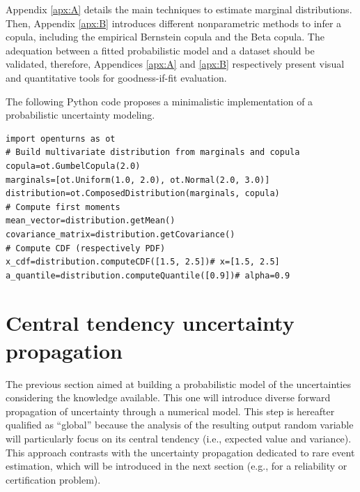 Appendix \ref{apx:A} details the main techniques to estimate marginal distributions. 
Then, Appendix \ref{apx:B} introduces different nonparametric methods to infer a copula, including the empirical Bernstein copula and the Beta copula. 
The adequation between a fitted probabilistic model and a dataset should be validated, therefore, Appendices \ref{apx:A} and \ref{apx:B} respectively present visual and quantitative tools for goodness-if-fit evaluation.


\begin{otexample}
    The following Python code proposes a minimalistic \ot implementation of a probabilistic uncertainty modeling. 
    \lstset{style=mystyle, language=python}
\begin{lstlisting}
import openturns as ot
# Build multivariate distribution from marginals and copula
copula=ot.GumbelCopula(2.0)
marginals=[ot.Uniform(1.0, 2.0), ot.Normal(2.0, 3.0)]
distribution=ot.ComposedDistribution(marginals, copula)
# Compute first moments
mean_vector=distribution.getMean()
covariance_matrix=distribution.getCovariance()
# Compute CDF (respectively PDF)
x_cdf=distribution.computeCDF([1.5, 2.5])# x=[1.5, 2.5]
a_quantile=distribution.computeQuantile([0.9])# alpha=0.9
\end{lstlisting}
\end{otexample}


\section{Central tendency uncertainty propagation}

The previous section aimed at building a probabilistic model of the uncertainties considering the knowledge available.
This one will introduce diverse forward propagation of uncertainty through a numerical model. 
This step is hereafter qualified as ``global'' because the analysis of the resulting output random variable will particularly focus on its central tendency (i.e., expected value and variance).
This approach contrasts with the uncertainty propagation dedicated to rare event estimation, which will be introduced in the next section (e.g., for a reliability or certification problem).


